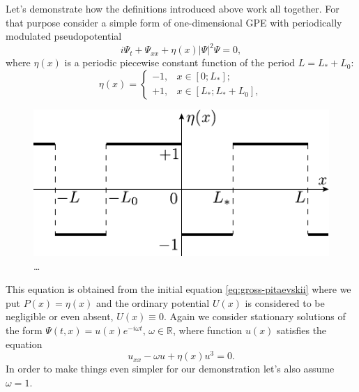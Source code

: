 Let's demonstrate how the definitions introduced above work all together.
For that purpose consider a simple form of one-dimensional GPE with periodically modulated pseudopotential
\begin{equation}
	i \Psi_t + \Psi_{xx} + \eta(x) |\Psi|^2 \Psi = 0,
\label{eq:gross-pitaevskii-piecewise}
\end{equation}
where $\eta(x)$ is a periodic piecewise constant function of the period $L = L_* + L_0$:
\begin{equation}
	\eta(x) = \left\{
		\begin{array}{rl}
			-1, & x \in [0; L_*]; \\
			+1, & x \in [L_*; L_* + L_0],
		\end{array}
	\right.
\label{eq:eta}
\end{equation}
\begin{figure}[h]
\centering
	\includegraphics[scale = 1.2]{pic/piecewise constant}
	\caption{\dots}
\label{fig:piecewise-constant}
\end{figure}
This equation is obtained from the initial equation \eqref{eq:gross-pitaevskii} where we put $P(x) = \eta(x)$ and the ordinary potential $U(x)$ is considered to be negligible or even absent, $U(x) \equiv 0$.
Again we consider stationary solutions of the form $\Psi(t, x) = u(x) e^{-i \omega t}, \, \omega \in \mathbb{R}$, where function $u(x)$ satisfies the equation
\begin{equation}
	u_{xx} - \omega u + \eta(x) u^3 = 0. 
\label{eq:stationary-piecewise}
\end{equation}
In order to make things even simpler for our demonstration let's also assume $\omega = 1$.

